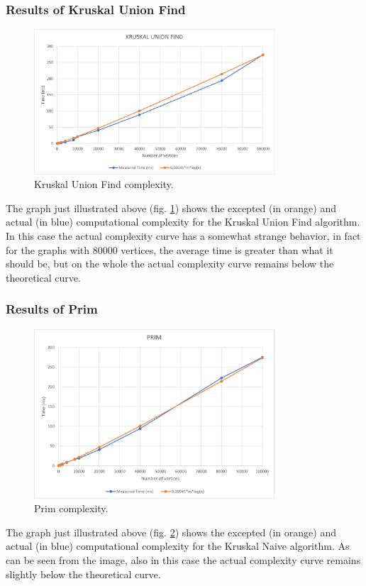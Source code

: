 \subsubsection{Results of Kruskal Union Find}
\begin{figure}[H]
	\centering
	\includegraphics[width=0.8\textwidth]{../img/KruskalUnionFind.png}
    \caption{Kruskal Union Find complexity.}
	\label{fig:kruskaluf}
\end{figure}
The graph just illustrated above (fig. \ref{fig:kruskaluf}) shows the excepted (in orange) and actual (in blue) computational complexity for the Kruskal Union Find algorithm. In this case the actual complexity curve has a somewhat strange behavior, in fact for the graphs with 80000 vertices, the average time is greater than what it should be, but on the whole the actual complexity curve remains below the theoretical curve.

\subsubsection{Results of Prim}
\begin{figure}[H]
	\centering
	\includegraphics[width=0.8\textwidth]{../img/Prim.png}
    \caption{Prim complexity.}
	\label{fig:prim}
\end{figure}
The graph just illustrated above (fig. \ref{fig:prim}) shows the excepted (in orange) and actual (in blue) computational complexity for the Kruskal Naive algorithm. As can be seen from the image, also in this case the actual complexity curve remains slightly below the theoretical curve.

